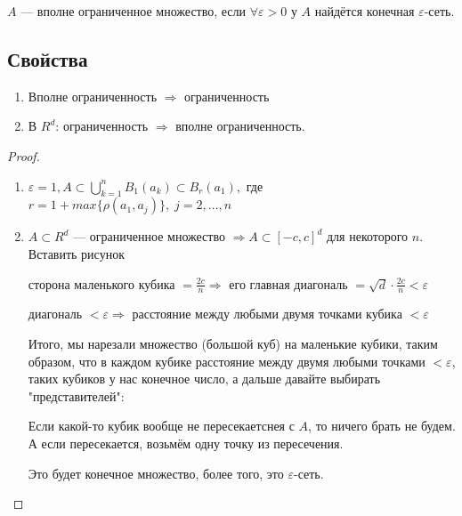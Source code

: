 \begin{conj}
    $A$ --- вполне ограниченное множество, если $\forall \varepsilon > 0$ у $A$ найдётся конечная $\varepsilon$-сеть.
\end{conj}

\subsection*{Свойства} 

\begin{enumerate}
    \item Вполне ограниченность $\Longrightarrow$ ограниченность
    \item В $R^d$: ограниченность $\Longrightarrow$ вполне ограниченность.
\end{enumerate}

\begin{proof}
    \begin{enumerate}
        \item $\varepsilon = 1, A \subset \bigcup_{k=1}^{n} B_1(a_k) \subset B_r(a_1),$ где $r = 1 + max \{ \rho(a_1, a_j) \}, \; j = 2, \dots, n$
        \item $A \subset R^d$ --- ограниченное множество $\Longrightarrow A \subset [-c, c]^d$ для некоторого $n$. \\

        Вставить рисунок %

        сторона маленького кубика $= \frac{2c}{n} \Longrightarrow$ его главная диагональ $= \sqrt{d} \cdot \frac{2c}{n} < \varepsilon$

        диагональ $< \varepsilon \Longrightarrow$ расстояние между любыми двумя точками кубика $< \varepsilon$

        Итого, мы нарезали множество (большой куб) на маленькие кубики, таким образом, что в каждом кубике расстояние между двумя любыми точками $< \varepsilon$,
        таких кубиков у нас конечное число, а дальше давайте выбирать "представителей":

        Если какой-то кубик вообще не пересекаетснея с $A$, то ничего брать не будем. А если пересекается, возьмём одну точку из пересечения.

        Это будет конечное множество, более того, это $\varepsilon$-сеть.
    \end{enumerate}
\end{proof}


